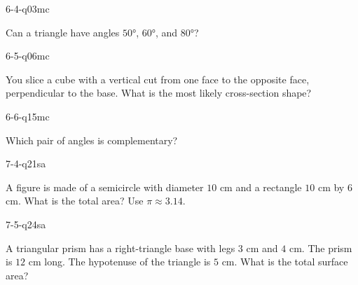 \begin{practiceQuestion}{6-4-q03}{mc}
\begin{questionText}
Can a triangle have angles $50°$, $60°$, and $80°$?
\end{questionText}
\end{practiceQuestion}

\begin{practiceQuestion}{6-5-q06}{mc}
\begin{questionText}
You slice a cube with a vertical cut from one face to the opposite face, perpendicular to the base. What is the most likely cross-section shape?
\end{questionText}
\end{practiceQuestion}

\begin{practiceQuestion}{6-6-q15}{mc}
\begin{questionText}
Which pair of angles is complementary?
\end{questionText}
\end{practiceQuestion}

\begin{practiceQuestion}{7-4-q21}{sa}
\begin{questionText}
A figure is made of a semicircle with diameter $10$ cm and a rectangle $10$ cm by $6$ cm. What is the total area? Use $\pi \approx 3.14$.
\end{questionText}
\end{practiceQuestion}

\begin{practiceQuestion}{7-5-q24}{sa}
\begin{questionText}
A triangular prism has a right-triangle base with legs $3$ cm and $4$ cm. The prism is $12$ cm long. The hypotenuse of the triangle is $5$ cm. What is the total surface area?
\end{questionText}
\end{practiceQuestion}

